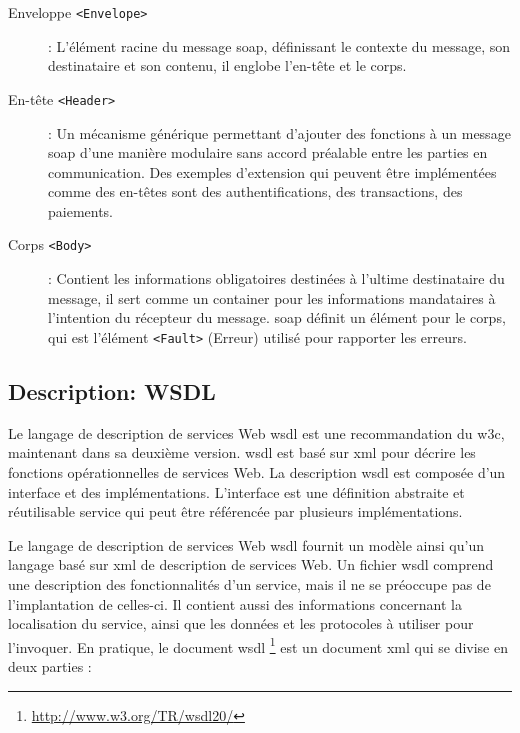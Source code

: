   \SpecialItem
  \renewcommand{\descriptionlabel}[1]{\hspace{1cm}\texttt{#1}}
  \begin{description}
  \item[Enveloppe \texttt{<Envelope>}]: L'élément racine du message
    \acrshort{soap}, définissant le contexte du message, son
    destinataire et son contenu, il englobe l'en-tête et le corps.

  \item[En-tête \texttt{<Header>}]: Un mécanisme générique permettant
    d'ajouter des fonctions à un message \acrshort{soap} d'une manière
    modulaire sans accord préalable entre les parties en
    communication.  Des exemples d'extension qui peuvent être
    implémentées comme des en-têtes sont des authentifications, des
    transactions, des paiements.

  \item[Corps \texttt{<Body>}]: Contient les informations obligatoires
    destinées à l'ultime destinataire du message, il sert comme un
    container pour les informations mandataires à l'intention du
    récepteur du message. \acrshort{soap} définit un élément pour le
    corps, qui est l'élément \texttt{<Fault>} (Erreur) utilisé pour
    rapporter les erreurs.
  \end{description}
  \enddescription

  \subsection{Description: WSDL}
  \label{sec:wsdl}

  Le langage de description de services Web \acrshort{wsdl}
  \cite{christensen2001web, chinnici2007web} est une recommandation du
  \acrshort{w3c}, maintenant dans sa deuxième version.
  \acrshort{wsdl} est basé sur \acrshort{xml} pour décrire les
  fonctions opérationnelles de services Web. La description
  \acrshort{wsdl} est composée d'un interface et des
  implémentations. L'interface est une définition abstraite et
  réutilisable service qui peut être référencée par plusieurs
  implémentations.

  

  Le langage de description de services Web \acrshort{wsdl}
  \cite{chinnici2007web} fournit un modèle ainsi qu'un langage basé
  sur \acrshort{xml} de description de services Web. Un fichier
  \acrshort{wsdl} comprend une description des fonctionnalités d'un
  service, mais il ne se préoccupe pas de l'implantation de celles-ci.
  Il contient aussi des informations concernant la localisation du
  service, ainsi que les données et les protocoles à utiliser pour
  l'invoquer. En pratique, le document \acrshort{wsdl}
  \footnote{\url{http://www.w3.org/TR/wsdl20/}} est un document
  \acrshort{xml} qui se divise en deux parties \cite{elie2010} :

